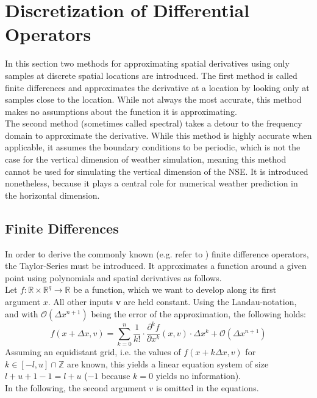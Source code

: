 \section{Discretization of Differential Operators}\label{section:diff_op}
In this section two methods for approximating spatial derivatives using only samples at discrete spatial locations are introduced.
The first method is called finite differences and approximates the derivative at a location by looking only at samples close to the location.
While not always the most accurate, this method makes no assumptions about the function it is approximating.\\
The second method (sometimes called spectral) takes a detour to the frequency domain to approximate the derivative.
While this method is highly accurate when applicable, it assumes the boundary conditions to be periodic, which is not the case for the vertical dimension of weather simulation, meaning this method cannot be used for simulating the vertical dimension of the NSE.
It is introduced nonetheless, because it plays a central role for numerical weather prediction in the horizontal dimension.

\subsection{Finite Differences}
In order to derive the commonly known (e.g. refer to \cite{smith1985numerical}) finite difference operators, the Taylor-Series must be introduced.
It approximates a function around a given point using polynomials and spatial derivatives as follows.\\
Let $f:\mathbb{R}\times\mathbb{R}^q\rightarrow \mathbb{R}$ be a function, which we want to develop along its first argument $x$.
All other inputs $\boldsymbol{v}$ are held constant.
Using the Landau-notation, and with $\mathcal{O}(\Delta x ^{n+1})$ being the error of the approximation, the following holds:
\begin{equation}
f(x+\Delta x,v) = \sum_{k=0}^{n}\frac{1}{k!}\cdot\frac{\partial^k f}{\partial x ^k}(x,v)\cdot \Delta x^k + \mathcal{O}(\Delta x ^{n+1})
\end{equation}
Assuming an equidistant grid, i.e. the values of $f(x+k\Delta x,v)$ for $k\in [-l,u] \cap \mathbb{Z}$ are known, this yields a linear equation system of size $l + u + 1 - 1= l + u$ ($-1$ because $k=0$ yields no information).\\
In the following, the second argument $v$ is omitted in the equations.


